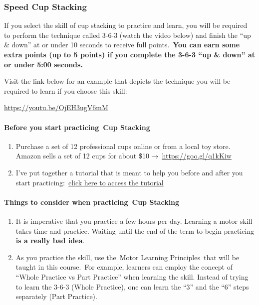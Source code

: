 \documentclass[
  letterpaper,
  DIV=11,
  numbers=noendperiod]{scrartcl}
\let\oldparagraph\paragraph
\renewcommand{\paragraph}[1]{\oldparagraph{#1}\mbox{}}
\providecommand{\tightlist}{%
  \setlength{\itemsep}{0pt}\setlength{\parskip}{0pt}}\usepackage{longtable,booktabs,array}
\begin{document}
\hypertarget{speed-cup-stacking}{%
\subsubsection{Speed Cup Stacking}\label{speed-cup-stacking}}

If you select the skill of cup stacking to practice and learn, you will
be required to perform the technique called 3-6-3 (watch the video
below) and finish the ``up \& down'' at or under 10 seconds to receive
full points.~\textbf{You can earn some extra points (up to 5 points) if
you complete the 3-6-3 ``up \& down'' at or under 5:00 seconds.}

Visit the link below for an example that depicts the technique you will
be required to learn if you choose this skill:

\url{https://youtu.be/OjEH3ugV6mM}

\hypertarget{before-you-start-practicing-cup-stacking}{%
\paragraph{\texorpdfstring{Before you start practicing~\textbf{Cup
Stacking}}{Before you start practicing~Cup Stacking}}\label{before-you-start-practicing-cup-stacking}}

\begin{enumerate}
\def\labelenumi{\arabic{enumi}.}
\tightlist
\item
  Purchase a set of 12 professional cups online or from a local toy
  store. Amazon sells a set of 12 cups for about \$10
  →~\url{https://goo.gl/q1kKiw}
\item
  I've put together a tutorial that is meant to help you before and
  after you start practicing:~\protect\hyperlink{sec-appendix-b}{click
  here to access the tutorial}
\end{enumerate}

\hypertarget{things-to-consider-when-practicing-cup-stacking}{%
\paragraph{\texorpdfstring{Things to consider when
practicing~\textbf{Cup
Stacking}}{Things to consider when practicing~Cup Stacking}}\label{things-to-consider-when-practicing-cup-stacking}}

\begin{enumerate}
\def\labelenumi{\arabic{enumi}.}
\tightlist
\item
  It is imperative that you practice a few hours per day. Learning a
  motor skill takes time and practice. Waiting until the end of the term
  to begin practicing \textbf{is a really bad idea}.
\item
  As you practice the skill, use the~Motor Learning Principles~that will
  be taught in this course.~For example, learners can employ the concept
  of ``Whole Practice vs Part Practice'' when learning the skill.
  Instead of trying to learn the 3-6-3 (Whole Practice), one can learn
  the ``3'' and the ``6'' steps separately (Part Practice).
\end{enumerate}
\end{document}
